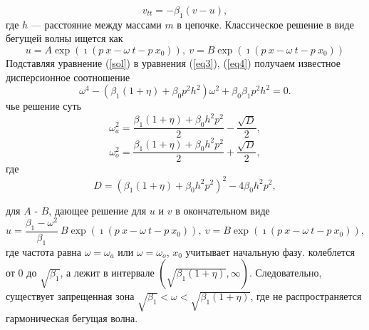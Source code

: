 \begin{equation}
v_{tt}=-\beta_1 (v-u), \label{eq4}
\end{equation}
где $ h $ --- расстояние между массами $ m $ в цепочке.
Классическое решение в виде бегущей волны ищется как
\begin{equation}\label{sol}
 u=A\exp (\imath(p~ x - \omega~ t- p~ x_0)), ~
   v=B \exp (\imath(p~ x - \omega~ t-p~ x_0))
\end{equation}
Подставляя уравнение (\ref{sol}) в уравнения (\ref{eq3}), (\ref{eq4}) получаем известное дисперсионное соотношение \cite{Huang2010}
\[
\omega^4 -(\beta_1(1+\eta)+\beta_0 p^2 h^2)\omega^2+\beta_0 \beta_1 p^2 h^2=0.
\]
чье решение суть 
\begin{equation}\label{acdiscr}
\omega_a^2=\frac{\beta_1(1+\eta)+\beta_0 h^2 p^2}{2}-\frac{\sqrt{D}}{2},
\end{equation}
\begin{equation}\label{optdiscr}
\omega_o^2=\frac{\beta_1(1+\eta)+\beta_0 h^2 p^2}{2}+\frac{\sqrt{D}}{2},
\end{equation}
где
\[
D=(\beta_1(1+\eta)+\beta_0 h^2 p^2)^2-4\beta_0 h^2 p^2,
\]

 для $A$ - $B$, дающее решение для $u$ и $v$ в окончательном виде
\begin{equation}\label{solfin}
 u=\frac{\beta_1-\omega^2}{\beta_1}~B\exp (\imath(p~ x - \omega~ t- p~ x_0)), ~
   v=B \exp (\imath(p~ x - \omega~ t- p~ x_0)),
\end{equation}
где частота равна $ \omega = \omega_a $ или $ \omega = \omega_o $, $ x_0 $ учитывает начальную фазу.
 колеблется от $ 0 $ до $ \sqrt {\beta_1} $, а  лежит в интервале $(\sqrt{\beta_1(1+\eta)}, \infty)$. Следовательно, существует запрещенная зона $ \sqrt {\beta_1} <\omega <\sqrt {\beta_1 (1+ \eta)} $, где не распространяется гармоническая бегущая волна.

